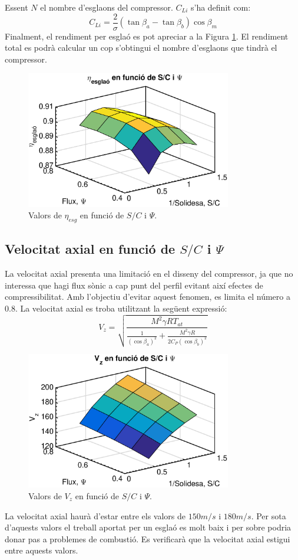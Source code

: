 Essent $N$ el nombre d'esglaons del compressor. $C_{Li}$ s'ha definit com: 
\begin{equation}
C_{Li}=\frac{2}{\sigma}(\tan\beta_a-\tan\beta_b)\cos\beta_m
\end{equation}
Finalment, el rendiment per esglaó es pot apreciar a la Figura \ref{ETAesg}. El rendiment total es podrà calcular un cop s'obtingui el nombre d'esglaons que tindrà el compressor. 
\begin{figure}[H]
	\centering
	\includegraphics[width=0.8\textwidth]{./code/figures/parametres/ETAesg}
	\caption{Valors de $\eta_{esg}$ en funció de $S/C$ i $\Psi$.}
	\label{ETAesg}
\end{figure}

\subsection{Velocitat axial en funció de $S/C$ i $\Psi$}
La velocitat axial presenta una limitació en el disseny del compressor, ja que no interessa que hagi flux sònic a cap punt del perfil evitant així efectes de compressibilitat. Amb l'objectiu d'evitar aquest fenomen, es limita el número a 0.8. La velocitat axial es troba utilitzant la següent expressió: 
\begin{equation}
V_z=\sqrt{\frac{M^2\gamma R T_{at}}{\frac{1}{(\cos\beta_a)^2}+\frac{M^2\gamma R}{2C_P(\cos\beta_b)^2}}}
\end{equation} 
\begin{figure}[H]
	\centering
	\includegraphics[width=0.8\textwidth]{./code/figures/parametres/Vz}
	\caption{Valors de $V_z$ en funció de $S/C$ i $\Psi$.}
	\label{Vz}
\end{figure}
La velocitat axial haurà d'estar entre els valors de $150m/s$ i $180m/s$. Per sota d'aquests valors el treball aportat per un esglaó es molt baix i per sobre podria donar pas a problemes de combustió. Es verificarà que la velocitat axial estigui entre aquests valors. 
